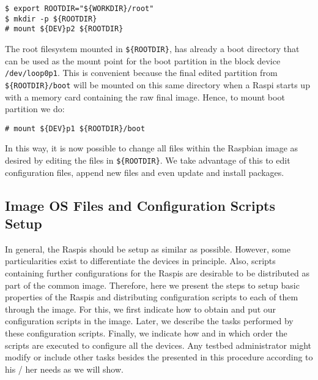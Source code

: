 \begin{lstlisting}[]
$ export ROOTDIR="${WORKDIR}/root"
$ mkdir -p ${ROOTDIR}
# mount ${DEV}p2 ${ROOTDIR}
\end{lstlisting}
\FloatBarrier
\vspace{-5mm}

The root filesystem mounted in \texttt{\$\{ROOTDIR\}}, has already a boot
directory that can be used as the mount point for the boot partition
in the block device \texttt{/dev/loop0p1}. This is convenient because
the final edited partition from \texttt{\$\{ROOTDIR\}/boot} will be mounted on
this same directory when a \ac{Raspi} starts up with a memory card
containing the raw final image. Hence, to mount boot partition we do:

\begin{lstlisting}[]
# mount ${DEV}p1 ${ROOTDIR}/boot
\end{lstlisting}
\FloatBarrier
\vspace{-5mm}

In this way, it is now possible to change all files within the Raspbian
image as desired by editing the files in \texttt{\$\{ROOTDIR\}}. We take
advantage of this to edit configuration files, append new files and even
update and install packages.

\subsection{Image OS Files and Configuration Scripts Setup}
In general, the \ac{Raspi}s should be setup as similar as possible. However,
some particularities exist to differentiate the devices in principle. Also,
scripts containing further configurations for the \ac{Raspi}s are desirable
to be distributed as part of the common image. Therefore, here we present
the steps to setup basic properties of the \ac{Raspi}s and distributing
configuration scripts to each of them through the image. For this, we first
indicate how to obtain and put our configuration scripts in the image. Later,
we describe the tasks performed by these configuration scripts. Finally, we
indicate how and in which order the scripts are executed to configure all the
devices. Any testbed administrator might modify or include other
tasks besides the presented in this procedure according to his / her needs
as we will show.

